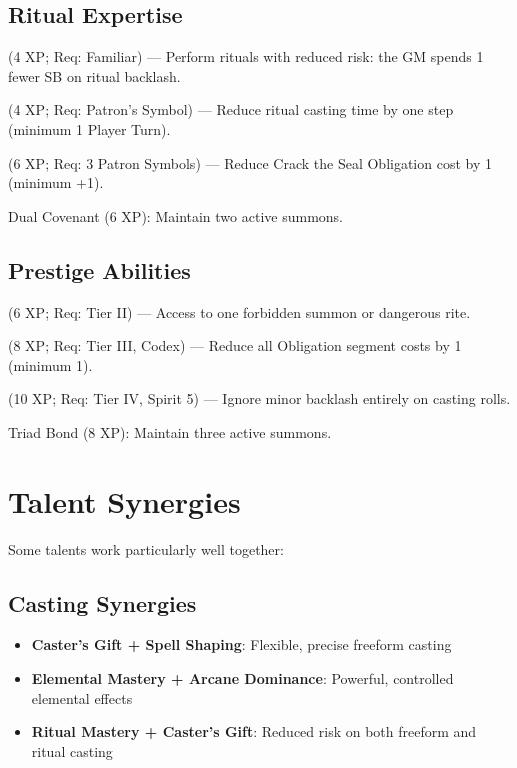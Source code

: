 \subsection*{Ritual Expertise}
\begin{description}
\item[Ritual Mastery] (4 XP; Req: Familiar) --- Perform rituals with reduced risk: the GM spends 1 fewer SB on ritual backlash.
\item[Efficient Invocation] (4 XP; Req: Patron's Symbol) --- Reduce ritual casting time by one step (minimum 1 Player Turn).
\item[Crack Specialist] (6 XP; Req: 3 Patron Symbols) --- Reduce Crack the Seal Obligation cost by 1 (minimum +1).
\item{Dual Covenant (6 XP):} Maintain two active summons.
\end{description}

\subsection*{Prestige Abilities}
\begin{description}
\item[Forbidden Knowledge] (6 XP; Req: Tier II) --- Access to one forbidden summon or dangerous rite.
\item[Obligation Master] (8 XP; Req: Tier III, Codex) --- Reduce all Obligation segment costs by 1 (minimum 1).
\item[Backlash Immunity] (10 XP; Req: Tier IV, Spirit 5) --- Ignore minor backlash entirely on casting rolls.
\item{Triad Bond (8 XP):} Maintain three active summons.
\end{description}

\section{Talent Synergies}

Some talents work particularly well together:

\subsection*{Casting Synergies}
\begin{itemize}
\item \textbf{Caster's Gift + Spell Shaping}: Flexible, precise freeform casting
\item \textbf{Elemental Mastery + Arcane Dominance}: Powerful, controlled elemental effects
\item \textbf{Ritual Mastery + Caster's Gift}: Reduced risk on both freeform and ritual casting
\end{itemize}

